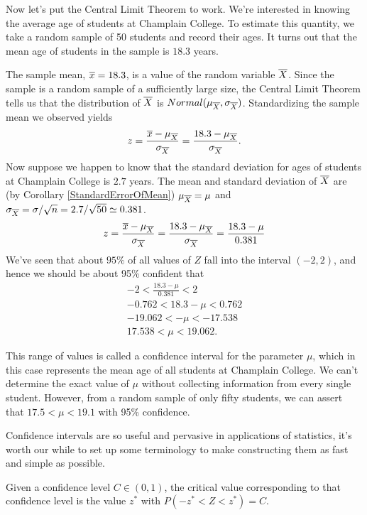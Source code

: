 Now let's put the Central Limit Theorem to work. We're interested in knowing the average age of students at Champlain College. To estimate this quantity, we take a random sample of 50 students and record their ages. It turns out that the mean age of students in the sample is $18.3$ years.
\par
The sample mean, ${\overline{x}} = 18.3$, is a value of the random variable ${\overline{X}}$. Since the sample is a random sample of a sufficiently large size, the Central Limit Theorem tells us that the distribution of ${\overline{X}}$ is $Normal(\mu_{\overline{X}}, \sigma_{\overline{X}})$. Standardizing the sample mean we observed yields
$$z = \frac{\overline{x} - \mu_{\overline{X}}}{\sigma_{\overline{X}}} = \frac{18.3 - \mu_{\overline{X}}}{\sigma_{\overline{X}}}.$$
Now suppose we happen to know that the standard deviation for ages of students at Champlain College is $2.7$ years. The mean and standard deviation of ${\overline{X}}$ are (by Corollary \ref{StandardErrorOfMean}) $\mu_{\overline{X}} = \mu$ and $\sigma_{\overline{X}} = \sigma / \sqrt{n} = 2.7 / \sqrt{50} \simeq 0.381$.
$$z = \frac{\overline{x}  - \mu_{\overline{X}}}{\sigma_{\overline{X}}} = \frac{18.3 - \mu_{\overline{X}}}{\sigma_{\overline{X}}} = \frac{18.3 - \mu}{0.381}$$
We've seen that about $95\%$ of all values of $Z$ fall into the interval $(-2, 2)$, and hence we should be about 95\% confident that
\begin{gather*}
-2 < \textstyle\frac{18.3 - \mu}{0.381} < 2 \\
-0.762 < 18.3 - \mu < 0.762 \\
-19.062 < - \mu < -17.538 \\
17.538 < \mu < 19.062.
\end{gather*}
\par
This range of values is called a confidence interval for the parameter $\mu$, which in this case represents the mean age of all students at Champlain College. We can't determine the exact value of $\mu$ without collecting information from every single student. However, from a random sample of only fifty students, we can assert that $17.5 < \mu < 19.1$ with 95\% confidence.
\par
Confidence intervals are so useful and pervasive in applications of statistics, it's worth our while to set up some terminology to make constructing them as fast and simple as possible.
\par
\begin{defn}Given a confidence level $C \in (0,1)$, the critical value corresponding to that confidence level is the value $z^*$ with $P(-z^* < Z < z^*) = C$.
\end{defn}
